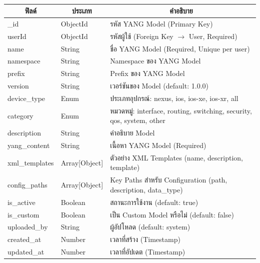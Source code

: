 \begin{table}[H]
    \caption{}
    \label{tab:yang-model-structure}
    \fontSixTeen 
    \begin{tabularx}{\textwidth}{|l|l|X|} 
        \hline
        \multicolumn{1}{|c|}{\textbf{ฟิลด์}} & \multicolumn{1}{c|}{\textbf{ประเภท}} & \multicolumn{1}{c|}{\textbf{คำอธิบาย}} \\
        \hline
        \_id & ObjectId & รหัส YANG Model (Primary Key) \\
        \hline
        userId & ObjectId & รหัสผู้ใช้ (Foreign Key $\rightarrow$ User, Required) \\
        \hline
        name & String & ชื่อ YANG Model (Required, Unique per user) \\
        \hline
        namespace & String & Namespace ของ YANG Model \\
        \hline
        prefix & String & Prefix ของ YANG Model \\
        \hline
        version & String & เวอร์ชันของ Model (default: 1.0.0) \\
        \hline
        device\_type & Enum & ประเภทอุปกรณ์: nexus, ios, ios-xe, ios-xr, all \\
        \hline
        category & Enum & หมวดหมู่: interface, routing, switching, security, qos, system, other \\
        \hline
        description & String & คำอธิบาย Model \\
        \hline
        yang\_content & String & เนื้อหา YANG Model (Required) \\
        \hline
        xml\_templates & Array[Object] & ตัวอย่าง XML Templates (name, description, template) \\
        \hline
        config\_paths & Array[Object] & Key Paths สำหรับ Configuration (path, description, data\_type) \\
        \hline
        is\_active & Boolean & สถานะการใช้งาน (default: true) \\
        \hline
        is\_custom & Boolean & เป็น Custom Model หรือไม่ (default: false) \\
        \hline
        uploaded\_by & String & ผู้อัปโหลด (default: system) \\
        \hline
        created\_at & Number & เวลาที่สร้าง (Timestamp) \\
        \hline
        updated\_at & Number & เวลาที่อัปเดต (Timestamp) \\
        \hline
    \end{tabularx}
\end{table}

